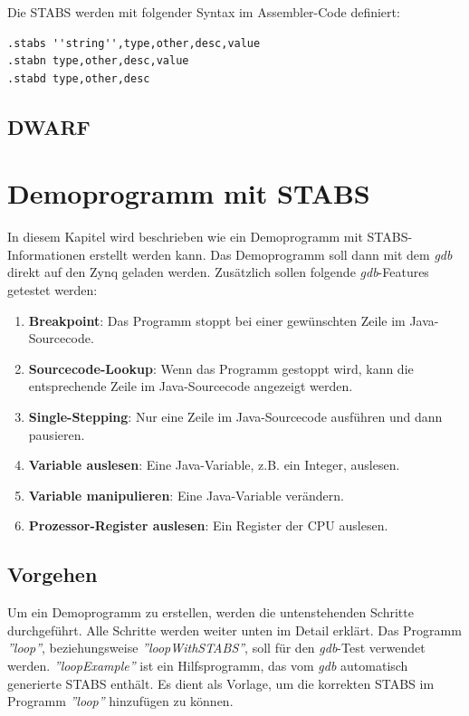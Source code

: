 Die STABS werden mit folgender Syntax im Assembler-Code definiert:\\
\lstset{language=plain}
\begin{lstlisting}
.stabs ''string'',type,other,desc,value
.stabn type,other,desc,value
.stabd type,other,desc
\end{lstlisting}



\subsection{DWARF}


\section{Demoprogramm mit STABS}
\label{section:demoprogrammSTABS}
In diesem Kapitel wird beschrieben wie ein Demoprogramm mit STABS-Informationen erstellt werden kann.
Das Demoprogramm soll dann mit dem \textit{gdb} direkt auf den Zynq geladen werden.
Zusätzlich sollen folgende \textit{gdb}-Features getestet werden:\\
\begin{enumerate}
	\item \textbf{Breakpoint}: Das Programm stoppt bei einer gewünschten Zeile im Java-Sourcecode.
	\item \textbf{Sourcecode-Lookup}: Wenn das Programm gestoppt wird, kann die entsprechende Zeile im Java-Sourcecode angezeigt werden.
	\item \textbf{Single-Stepping}: Nur eine Zeile im Java-Sourcecode ausführen und dann pausieren.
	\item \textbf{Variable auslesen}: Eine Java-Variable, z.B. ein Integer, auslesen.
	\item \textbf{Variable manipulieren}: Eine Java-Variable verändern.
	\item \textbf{Prozessor-Register auslesen}: Ein Register der CPU auslesen.
\end{enumerate}


\subsection{Vorgehen}
Um ein Demoprogramm zu erstellen, werden die untenstehenden Schritte durchgeführt.
Alle Schritte werden weiter unten im Detail erklärt.
Das Programm \textit{''loop''}, beziehungsweise \textit{''loopWithSTABS''}, soll für den \textit{gdb}-Test verwendet werden.
\textit{''loopExample''} ist ein Hilfsprogramm, das vom \textit{gdb} automatisch generierte STABS enthält.
Es dient als Vorlage, um die korrekten STABS im Programm \textit{''loop''} hinzufügen zu können.

